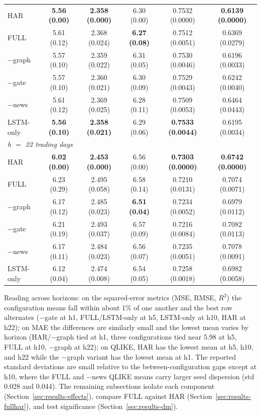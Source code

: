 \documentclass[runningheads]{llncs}
\begin{document}
\begin{table}[t]
\begin{tabular}{lccccc}
HAR         & \textbf{5.56 (0.00)} & \textbf{2.358 (0.000)} & 6.30 (0.00) & 0.7532 (0.0000) & \textbf{0.6139 (0.0000)} \\
FULL        & 5.61 (0.12) & 2.368 (0.024) & \textbf{6.27 (0.08)} & 0.7512 (0.0051) & 0.6369 (0.0279) \\
$-$graph    & 5.57 (0.10) & 2.359 (0.022) & 6.31 (0.05) & 0.7530 (0.0046) & 0.6196 (0.0033) \\
$-$gate     & 5.57 (0.10) & 2.360 (0.021) & 6.30 (0.09) & 0.7529 (0.0043) & 0.6242 (0.0040) \\
$-$news     & 5.61 (0.12) & 2.369 (0.025) & 6.28 (0.11) & 0.7509 (0.0053) & 0.6464 (0.0443) \\
LSTM-only   & \textbf{5.56 (0.10)} & \textbf{2.358 (0.021)} & 6.29 (0.06) & \textbf{0.7533 (0.0044)} & 0.6195 (0.0034) \\
\midrule
\multicolumn{6}{l}{\emph{h $=$ 22 trading days}} \\
HAR         & \textbf{6.02 (0.00)} & \textbf{2.453 (0.000)} & 6.56 (0.00) & \textbf{0.7303 (0.0000)} & \textbf{0.6742 (0.0000)} \\
FULL        & 6.23 (0.29) & 2.495 (0.058) & 6.58 (0.14) & 0.7210 (0.0131) & 0.7074 (0.0071) \\
$-$graph    & 6.17 (0.12) & 2.485 (0.023) & \textbf{6.51 (0.04)} & 0.7234 (0.0052) & 0.6979 (0.0112) \\
$-$gate     & 6.21 (0.19) & 2.493 (0.037) & 6.57 (0.09) & 0.7216 (0.0084) & 0.7082 (0.0113) \\
$-$news     & 6.17 (0.11) & 2.484 (0.023) & 6.56 (0.07) & 0.7235 (0.0051) & 0.7078 (0.0091) \\
LSTM-only   & 6.12 (0.04) & 2.474 (0.008) & 6.54 (0.05) & 0.7258 (0.0018) & 0.6982 (0.0058) \\
\bottomrule
\end{tabular}
\end{table}

Reading across horizons: on the squared-error metrics (MSE, RMSE, $R^2$) the configuration means fall
within about 1\% of one another and the best row alternates ($-$gate at h1, FULL/LSTM-only at h5,
LSTM-only at h10, HAR at h22); on MAE the differences are similarly small and the lowest mean varies by
horizon (HAR/$-$graph tied at h1, three configurations tied near 5.98 at h5, FULL at h10, $-$graph at h22);
on QLIKE, HAR has the lowest mean at h5, h10, and h22 while the $-$graph variant has the lowest mean at h1.
The reported standard deviations are small relative to the between-configuration gaps except at h10, where
the FULL and $-$news QLIKE means carry larger seed dispersion (std 0.028 and 0.044). The remaining
subsections isolate each component (Section~\ref{sec:results-effects}), compare FULL against HAR
(Section~\ref{sec:results-fullhar}), and test significance (Section~\ref{sec:results-dm}).
\end{document}
